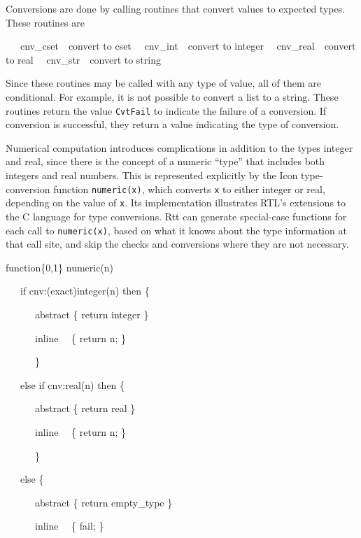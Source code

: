 Conversions are done by calling routines that convert values to
expected types. These routines are

\ \ \ cnv\_cset\ \ convert to cset\newline
 \ \ cnv\_int\ \ convert to integer\newline
 \ \ cnv\_real\ \ convert to real\newline
 \ \ cnv\_str\ \ convert to string

Since these routines may be called with any type of value, all of them
are conditional. For example, it is not possible to convert a list to
a string. These routines return the value \texttt{CvtFail} to indicate
the failure of a conversion. If conversion is successful, they return
a value indicating the type of conversion.

Numerical computation introduces complications in addition to the
types integer and real, since there is the concept of a numeric
``type'' that includes both integers and real numbers. This is
represented explicitly by the Icon type-conversion function
\texttt{numeric(x)}, which converts \texttt{x} to either integer or
real, depending on the value of \texttt{x}. Its implementation
illustrates RTL's extensions to the C language for type conversions.
Rtt can generate special-case functions for each call to
\texttt{numeric(x)}, based on what it knows about the type information
at that call site, and skip the checks and conversions where they are
not necessary.

{\ttfamily\mdseries
function\{0,1\} numeric(n)}

{\ttfamily\mdseries
\ \ \ if cnv:(exact)integer(n) then \{}

{\ttfamily\mdseries
\ \ \ \ \ \ abstract \{ return integer \}}

{\ttfamily\mdseries
\ \ \ \ \ \ inline \ \ \{ return n; \}}

{\ttfamily\mdseries
\ \ \ \ \ \ \}}

{\ttfamily\mdseries
\ \ \ else if cnv:real(n) then \{}

{\ttfamily\mdseries
\ \ \ \ \ \ abstract \{ return real \}}

{\ttfamily\mdseries
\ \ \ \ \ \ inline \ \ \{ return n; \}}

{\ttfamily\mdseries
\ \ \ \ \ \ \}}

{\ttfamily\mdseries
\ \ \ else \{}

{\ttfamily\mdseries
\ \ \ \ \ \ abstract \{ return empty\_type \}}

{\ttfamily\mdseries
\ \ \ \ \ \ inline \ \ \{ fail; \}}

